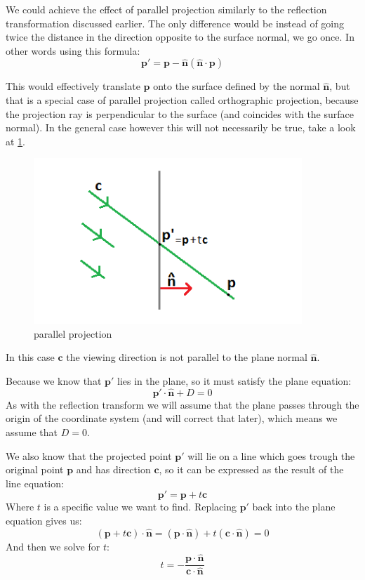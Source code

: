 \documentclass[]{report}   %
\begin{document}
We could achieve the effect of parallel projection similarly to the reflection transformation discussed earlier. The only difference would be instead of going twice the distance in the direction opposite to the surface normal,
we go once. In other words using this formula:
\[
	\mathbf{p\prime} = 
	\mathbf{p} - \mathbf{\hat{n}}(\mathbf{\hat{n}} \cdot \mathbf{p})
\]

This would effectively translate \(\mathbf{p}\) onto the surface defined by the normal \(\mathbf{\hat{n}}\), but that is a special case of parallel projection called orthographic projection, because the projection ray is perpendicular to the surface (and coincides with the surface normal). In the general case however this will not necessarily be true, take a look at \ref{fig:parproj}.
\begin{figure}[htb]
\centering
\includegraphics[width=0.9\textwidth]{projection-diagram}
\caption{parallel projection}
\label{fig:parproj}
\end{figure}
In this case \(\mathbf{c}\) the viewing direction is not parallel to the plane normal \(\mathbf{\hat{n}}\).

Because we know that \(\mathbf{p\prime}\) lies in the plane, so it must satisfy the plane equation:
\[
	\mathbf{p\prime} \cdot \mathbf{\hat{n}} + D = 0
\]
As with the reflection transform we will assume that the plane passes through the origin of the coordinate system (and will correct that later), which means we assume that \(D=0\).

We also know that the projected point \(\mathbf{p\prime}\) will lie on a line which goes trough the original point \(\mathbf{p}\) and has direction \(\mathbf{c}\), so it can be expressed as the result of the line equation:
\[
	\mathbf{p\prime} = \mathbf{p} + t\mathbf{c}
\]
Where \(t\) is a specific value we want to find. Replacing \(\mathbf{p\prime}\) back into the plane equation gives us:
\[
	(\mathbf{p} + t\mathbf{c}) \cdot \mathbf{\hat{n}} = 
	(\mathbf{p} \cdot \mathbf{\hat{n}}) + t(\mathbf{c} \cdot \mathbf{\hat{n}}) = 0
\]
And then we solve for \(t\):
\[
	t = -\frac{\mathbf{p} \cdot \mathbf{\hat{n}}}{\mathbf{c} \cdot \mathbf{\hat{n}}}
\]
\end{document}

